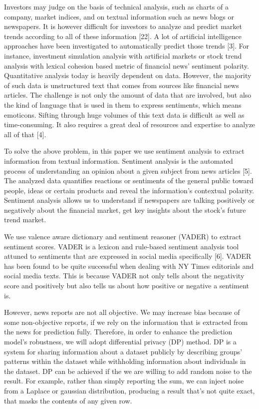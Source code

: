 \documentclass{article}
\begin{document}
Investors may judge on the basis of technical analysis, such as charts of a company, market indices, and on textual information such as news blogs or newspapers. It is however difficult for investors to analyze and predict market trends according to all of these information [22]. A lot of artificial intelligence approaches have been investigated to automatically predict those trends [3]. For instance, investment simulation analysis with artificial markets or stock trend analysis with lexical cohesion based metric of financial news' sentiment polarity. Quantitative analysis today is heavily dependent on data. However, the majority of such data is unstructured text that comes from sources like financial news articles. The challenge is not only the amount of data that are involved, but also the kind of language that is used in them to express sentiments, which means emoticons. Sifting through huge volumes of this text data is difficult as well as time-consuming. It also requires a great deal of resources and expertise to analyze all of that [4].

To solve the above problem, in this paper we use sentiment analysis to extract information from textual information. Sentiment analysis is the automated process of understanding an opinion about a given subject from news articles [5]. The analyzed data quantifies reactions or sentiments of the general public toward people, ideas or certain products and reveal the information's contextual polarity. Sentiment analysis allows us to understand if newspapers are talking positively or negatively about the financial market, get key insights about the stock's future trend market.

We use valence aware dictionary and sentiment reasoner (VADER) to extract sentiment scores. VADER is a lexicon and rule-based sentiment analysis tool attuned to sentiments that are expressed in social media specifically [6]. VADER has been found to be quite successful when dealing with NY Times editorials and social media texts. This is because VADER not only tells about the negativity score and positively but also tells us about how positive or negative a sentiment is.

However, news reports are not all objective. We may increase bias because of some non-objective reports, if we rely on the information that is extracted from the news for prediction fully. Therefore, in order to enhance the prediction model's robustness, we will adopt differential privacy (DP) method. DP is a system for sharing information about a dataset publicly by describing groups' patterns within the dataset while withholding information about individuals in the dataset. DP can be achieved if the we are willing to add random noise to the result. For example, rather than simply reporting the sum, we can inject noise from a Laplace or gaussian distribution, producing a result that’s not quite exact, that masks the contents of any given row.
\end{document}
